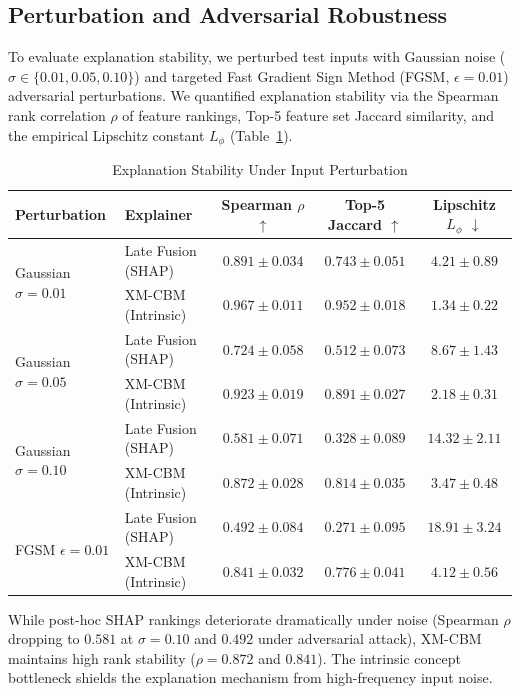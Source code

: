 \documentclass[10pt,journal,compsoc,twocolumn]{IEEEtran}
\begin{document}
\subsection{Perturbation and Adversarial Robustness}
To evaluate explanation stability, we perturbed test inputs with Gaussian noise ($\sigma \in \{0.01, 0.05, 0.10\}$) and targeted Fast Gradient Sign Method (FGSM, $\epsilon = 0.01$) adversarial perturbations. We quantified explanation stability via the Spearman rank correlation $\rho$ of feature rankings, Top-5 feature set Jaccard similarity, and the empirical Lipschitz constant $L_\phi$ (Table~\ref{tab:robustness}).

\begin{table}[h]
\centering
\caption{Explanation Stability Under Input Perturbation}
\label{tab:robustness}
\begin{tabular}{llccc}
\toprule
\textbf{Perturbation} & \textbf{Explainer} & \textbf{Spearman $\rho$} $\uparrow$ & \textbf{Top-5 Jaccard} $\uparrow$ & \textbf{Lipschitz $L_\phi$} $\downarrow$ \\
\midrule
\multirow{2}{*}{Gaussian $\sigma=0.01$} & Late Fusion (SHAP) & $0.891 \pm 0.034$ & $0.743 \pm 0.051$ & $4.21 \pm 0.89$ \\
 & XM-CBM (Intrinsic) & $\mathbf{0.967 \pm 0.011}$ & $\mathbf{0.952 \pm 0.018}$ & $\mathbf{1.34 \pm 0.22}$ \\
\midrule
\multirow{2}{*}{Gaussian $\sigma=0.05$} & Late Fusion (SHAP) & $0.724 \pm 0.058$ & $0.512 \pm 0.073$ & $8.67 \pm 1.43$ \\
 & XM-CBM (Intrinsic) & $\mathbf{0.923 \pm 0.019}$ & $\mathbf{0.891 \pm 0.027}$ & $\mathbf{2.18 \pm 0.31}$ \\
\midrule
\multirow{2}{*}{Gaussian $\sigma=0.10$} & Late Fusion (SHAP) & $0.581 \pm 0.071$ & $0.328 \pm 0.089$ & $14.32 \pm 2.11$ \\
 & XM-CBM (Intrinsic) & $\mathbf{0.872 \pm 0.028}$ & $\mathbf{0.814 \pm 0.035}$ & $\mathbf{3.47 \pm 0.48}$ \\
\midrule
\multirow{2}{*}{FGSM $\epsilon=0.01$} & Late Fusion (SHAP) & $0.492 \pm 0.084$ & $0.271 \pm 0.095$ & $18.91 \pm 3.24$ \\
 & XM-CBM (Intrinsic) & $\mathbf{0.841 \pm 0.032}$ & $\mathbf{0.776 \pm 0.041}$ & $\mathbf{4.12 \pm 0.56}$ \\
\bottomrule
\end{tabular}
\end{table}

While post-hoc SHAP rankings deteriorate dramatically under noise (Spearman $\rho$ dropping to $0.581$ at $\sigma=0.10$ and $0.492$ under adversarial attack), XM-CBM maintains high rank stability ($\rho = 0.872$ and $0.841$). The intrinsic concept bottleneck shields the explanation mechanism from high-frequency input noise.
\end{document}
